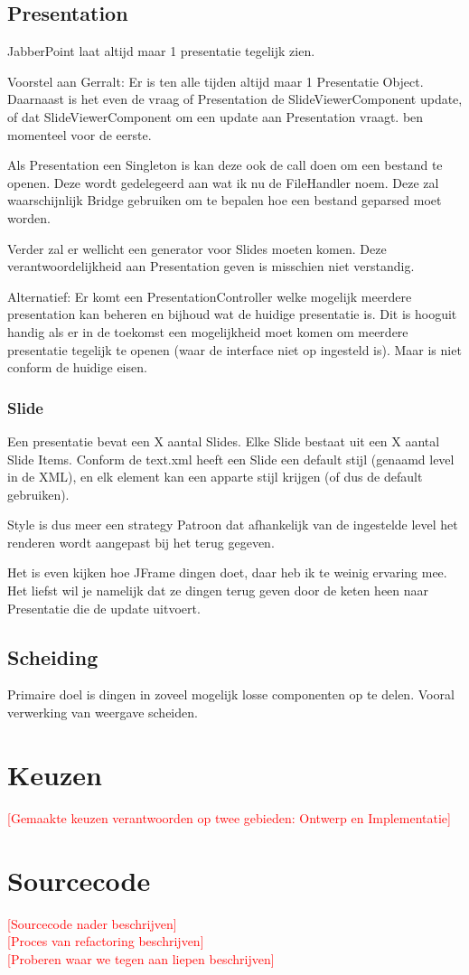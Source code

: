 \documentclass[a4paper]{article}
\newcommand{\todo}[1]{\textcolor{red}{[#1]}}
\newcommand{\1}[0]{\'{e}\'{e}n}
\begin{document}
\subsection{Presentation}
JabberPoint laat altijd maar 1 presentatie tegelijk zien.

Voorstel aan Gerralt: Er is ten alle tijden altijd maar 1 Presentatie Object.
Daarnaast is het even de vraag of Presentation de SlideViewerComponent update,
of dat SlideViewerComponent om een update aan Presentation vraagt. ben momenteel
voor de eerste.

Als Presentation een Singleton is kan deze ook de call doen om een bestand te
openen. Deze wordt gedelegeerd aan wat ik nu de FileHandler noem. Deze zal
waarschijnlijk Bridge gebruiken om te bepalen hoe een bestand geparsed moet
worden.

Verder zal er wellicht een generator voor Slides moeten komen. Deze
verantwoordelijkheid aan Presentation geven is misschien niet verstandig.

Alternatief: Er komt een PresentationController welke mogelijk meerdere
presentation kan beheren en bijhoud wat de huidige presentatie is. Dit is
hooguit handig als er in de toekomst een mogelijkheid moet komen om meerdere
presentatie tegelijk te openen (waar de interface niet op ingesteld is). Maar is
niet conform de huidige eisen.

\subsubsection{Slide}
Een presentatie bevat een X aantal Slides. Elke Slide bestaat uit een X aantal
Slide Items. Conform de text.xml heeft een Slide een default stijl (genaamd
level in de XML), en elk element kan een apparte stijl krijgen (of dus de
default gebruiken).

Style is dus meer een strategy Patroon dat afhankelijk van de ingestelde level
het renderen wordt aangepast bij het terug gegeven.

Het is even kijken hoe JFrame dingen doet, daar heb ik te weinig ervaring mee.
Het liefst wil je namelijk dat ze dingen terug geven door de keten heen naar
Presentatie die de update uitvoert.

\subsection{Scheiding}
Primaire doel is dingen in zoveel mogelijk losse componenten op te delen.
Vooral verwerking van weergave scheiden.

\section{Keuzen}
\todo{Gemaakte keuzen verantwoorden op twee gebieden: Ontwerp en Implementatie}


\section{Sourcecode}
\label{sec:source}
\todo{Sourcecode nader beschrijven}
\\
\todo{Proces van refactoring beschrijven}
\\
\todo{Proberen waar we tegen aan liepen beschrijven}
\end{document}
